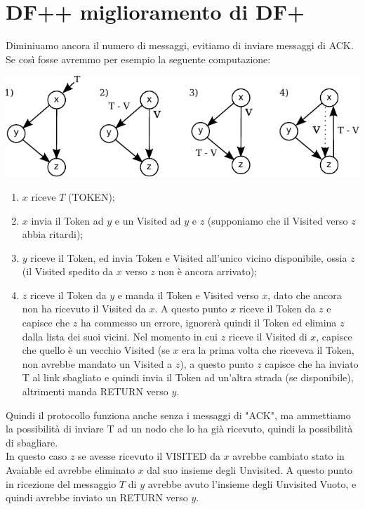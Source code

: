\section{DF++ miglioramento di DF+}
Diminiuamo ancora il numero di messaggi, evitiamo di inviare messaggi di ACK. Se così fosse avremmo per esempio la seguente computazione:

\begin{center}
  \includegraphics[scale=1.5]{images/n_17}
\end{center}

\begin{enumerate}
  \item $x$ riceve $T$ (TOKEN);
  \item $x$ invia il Token ad $y$ e un Visited ad $y$ e $z$ (supponiamo che il Visited verso $z$ abbia ritardi);
  \item $y$ riceve il Token, ed invia Token e Visited all'unico vicino disponibile, ossia $z$ (il Visited spedito da $x$ verso $z$ non è ancora arrivato);
  \item $z$ riceve il Token da $y$ e manda il Token e Visited verso $x$, dato che ancora non ha ricevuto il Visited da $x$. A questo punto $x$ riceve il Token da $z$ e capisce che $z$ ha commesso un errore, ignorerà quindi il Token ed elimina $z$ dalla lista dei suoi vicini. Nel momento in cui $z$ riceve il Visited di $x$, capisce che quello è un vecchio Visited (se $x$ era la prima volta che riceveva il Token, non avrebbe mandato un Visited a $z$), a questo punto $z$ capisce che ha inviato T al link sbagliato e quindi invia il Token ad un'altra strada (se disponibile), altrimenti manda RETURN verso $y$.
\end{enumerate}
Quindi il protocollo funziona anche senza i messaggi di "ACK", ma ammettiamo la possibilità di inviare T ad un nodo che lo ha già ricevuto, quindi la possibilità di sbagliare.\\
In questo caso $z$ se avesse ricevuto il VISITED da $x$ avrebbe cambiato stato in Avaiable ed avrebbe eliminato $x$ dal suo insieme degli Unvisited. A questo punto in ricezione del messaggio $T$ di $y$ avrebbe avuto l'insieme degli Unvisited Vuoto, e quindi avrebbe inviato un RETURN verso $y$.



